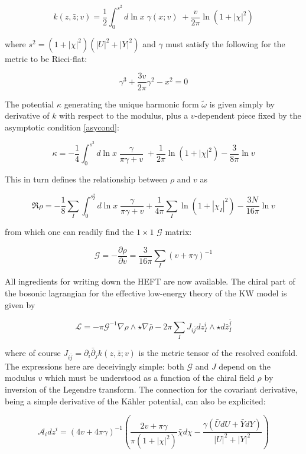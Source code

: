 \begin{equation}
	k(z,\bar z; v) = \frac{1}{2} \int_0^{s^2} d\ln x \; \gamma(x;v) \; + \frac{v}{2\pi} \ln(1+|\chi|^2)
	\label{}
\end{equation}

where $s^2 = (1+|\chi|^2)(|U|^2 + |Y|^2)$ and $\gamma$ must satisfy the following for the metric to be Ricci-flat:

\begin{equation}
	\gamma^3 + \frac{3v}{2\pi} \gamma^2 - x^2 = 0
	\label{}
\end{equation}

The potential $\kappa$ generating the unique harmonic form $\tilde\omega$ is given simply by derivative of $k$ with respect to the modulus, plus a $v$-dependent piece fixed by the asymptotic condition \ref{asycond}:

\begin{equation}
	\kappa = -\frac{1}{4} \int_0^{s^2} d\ln x \; \frac{\gamma}{\pi\gamma+v} \; + \frac{1}{2\pi} \ln(1+ |\chi|^2) - \frac{3}{8\pi}\ln v
	\label{}
\end{equation}

This in turn defines the relationship between $\rho$ and $v$ as

\begin{equation}
	\Re \rho = - \frac{1}{8} \sum_I \int_0^{s_I^2} d\ln x \; \frac{\gamma}{\pi\gamma + v} + \frac{1}{4\pi}\sum_I \ln(1+|\chi_I|^2) - \frac{3N}{16\pi} \ln v
\end{equation}

from which one can readily find the $1\times1$ $\mathcal{G}$ matrix:

\begin{equation}
	\mathcal{G} = - \frac{\partial \rho}{\partial v} = \frac{3}{16\pi}\sum_I (v+\pi\gamma)^{-1}
	\label{}
\end{equation}

All ingredients for writing down the HEFT are now available. The chiral part of the bosonic lagrangian for the effective low-energy theory of the KW model is given by

\begin{equation}
	\mathcal{L} = - \pi \mathcal{G}^{-1} \nabla \rho \wedge \star \nabla \bar \rho - 2\pi \sum_I J_{i\bar j} dz_I^i \wedge \star d\bar z_I^{\bar j} 
	\label{}
\end{equation}

where of course $J_{i\bar j} = \partial_i \bar \partial_j k(z,\bar z; v)$ is the metric tensor of the resolved conifold. The expressions here are deceivingly simple: both $\mathcal{G}$ and $J$ depend on the modulus $v$ which must be understood as a function of the chiral field $\rho$ by inversion of the Legendre transform. The connection for the covariant derivative, being a simple derivative of the K\"ahler potential, can also be explicited:

\begin{equation}
	\mathcal{A}_i dz^i = (4v + 4\pi \gamma)^{-1} \left( \frac{2v + \pi\gamma}{\pi(1+|\chi|^2)}\bar\chi d\chi - \frac{\gamma\left( \bar U dU + \bar Y dY \right)}{|U|^2 + |Y|^2} \right)
	\label{}
\end{equation}
